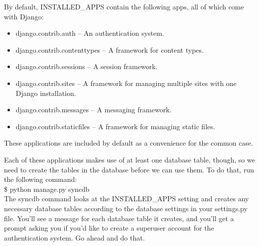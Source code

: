 By default, INSTALLED\_APPS contain the following apps, all of which 
come with Django:
\begin{itemize}
\item django.contrib.auth -- An authentication system.
\item django.contrib.contenttypes -- A framework for content types.
\item django.contrib.sessions -- A session framework.
\item django.contrib.sites -- A framework for managing multiple sites 
with one Django installation.
\item django.contrib.messages -- A messaging framework.
\item django.contrib.staticfiles -- A framework for managing static 
files.
\end{itemize}

These applications are included by default as a convenience for the 
common case.

Each of these applications makes use of at least one database table, 
though, so we need to create the tables in the database before we can 
use them. To do that, run the following command:\\

	\$ python manage.py syncdb\\

The syncdb command looks at the INSTALLED\_APPS setting and creates 
any necessary database tables according to the database settings in 
your settings.py file. You'll see a message for each database table it 
creates, and you'll get a prompt asking you if you'd like to create a 
superuser account for the authentication system. Go ahead and do that.

